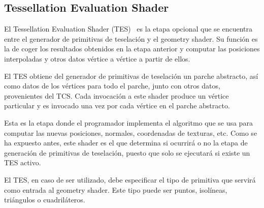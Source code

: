 \subsection{Tessellation Evaluation Shader}
\label{ref:TesEvaShader}

El Tessellation Evaluation Shader (TES)~\cite{TesEvaShader} es la etapa opcional
que se encuentra entre el generador de primitivas de teselación y el geometry
shader. Su función es la de coger los resultados obtenidos en la etapa anterior
y computar las posiciones interpoladas y otros datos vértice a vértice a partir
de ellos.

El TES obtiene del generador de primitivas de teselación un parche abstracto,
así como datos de los vértices para todo el parche, junto con otros datos,
provenientes del TCS. Cada invocación a este shader produce un vértice
particular y es invocado una vez por cada vértice en el parche abstracto.

Esta es la etapa donde el programador implementa el algoritmo que se usa para
computar las nuevas posiciones, normales, coordenadas de texturas, etc. Como se
ha expuesto antes, este shader es el que determina si ocurrirá o no la etapa de
generación de primitivas de teselación, puesto que solo se ejecutará si existe
un TES activo.

El TES, en caso de ser utilizado, debe especificar el tipo de primitiva que
servirá como entrada al geometry shader. Este tipo puede ser puntos, isolíneas,
triángulos o cuadriláteros.

